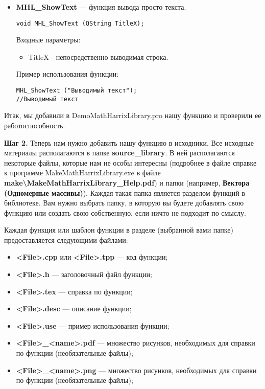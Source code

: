 \documentclass[a4paper,12pt]{article}
\begin{document}
\begin{itemize}
\item \textbf{MHL\_ShowText} --- функция вывода просто текста. 
\begin{lstlisting}[label=examplefunction14855, caption=Синтаксис функции MHL\_ShowText]
void MHL_ShowText (QString TitleX);
\end{lstlisting}
Входные параметры: 
\begin{itemize}   
     \item TitleX - непосредственно выводимая строка.
\end{itemize}
Пример использования функции:
\begin{lstlisting}[label=examplefunction14855, caption=Пример использования MHL\_ShowText]
MHL_ShowText ("Выводимый текст");
//Выводимый текст

\end{lstlisting}


\end{itemize}

Итак, мы добавили в DemoMathHarrixLibrary.pro нашу функцию и проверили ее работоспособность. 

\textbf{Шаг 2.}\label{step2} Теперь нам нужно добавить нашу функцию в исходники. Все исходные материалы располагаются в папке \textbf{source\_library}. В ней располагаются некоторые файлы, которые нам не особы интересны (подробнее в файле справке к программе MakeMathHarrixLibrary.exe в файле \textbf{make\textbackslash MakeMathHarrixLibrary\_Help.pdf}) и папки (например, \textbf{Вектора (Одномерные массивы)}). Каждая такая папка является разделом функций в библиотеке. Вам нужно выбрать папку, в которую вы будете добавлять свою функцию или создать свою собственную, если ничто не подходит по смыслу.

Каждая функция или шаблон функции в разделе (выбранной вами папке) предоставляется следующими файлами:
\begin{itemize}
\item \textbf{<File>.cpp} или \textbf{<File>.tpp} --- код функции;
\item \textbf{<File>.h} --- заголовочный файл функции;
\item \textbf{<File>.tex} --- справка по функции;
\item \textbf{<File>.desc} --- описание функции;
\item \textbf{<File>.use} --- пример использования функции;
\item \textbf{<File>\_<name>.pdf} --- множество рисунков, необходимых для справки по функции (необязательные файлы);
\item \textbf{<File>\_<name>.png} --- множество рисунков, необходимых для справки по функции (необязательные файлы);
\end{itemize}
\end{document}
